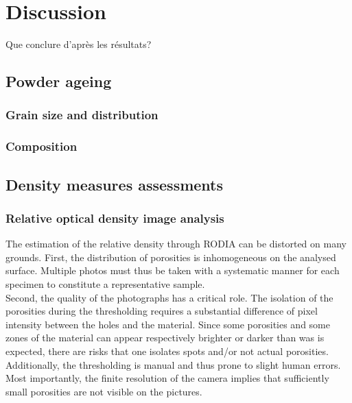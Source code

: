 \chapter{Discussion}
\label{Chap5}
Que conclure d'après les résultats?
\section{Powder ageing}
\subsection{Grain size and distribution}


\subsection{Composition}

\section{Density measures assessments}
\label{DDMA}



\subsection{Relative optical density image analysis}
\label{DRODIA}

The estimation of the relative density through RODIA can be distorted on many grounds. First, the distribution of porosities is inhomogeneous on the analysed surface. Multiple photos must thus be taken with a systematic manner for each specimen to constitute a representative sample.\\

Second, the quality of the photographs has a critical role. The isolation of the porosities during the thresholding requires a substantial difference of pixel intensity between the holes and the material. Since some porosities and some zones of the material can appear respectively brighter or darker than was is expected, there are risks that one isolates spots and/or not actual porosities. Additionally, the thresholding is manual and thus prone to slight human errors. \\

Most importantly, the finite resolution of the camera implies that sufficiently small porosities are not visible on the pictures. 

